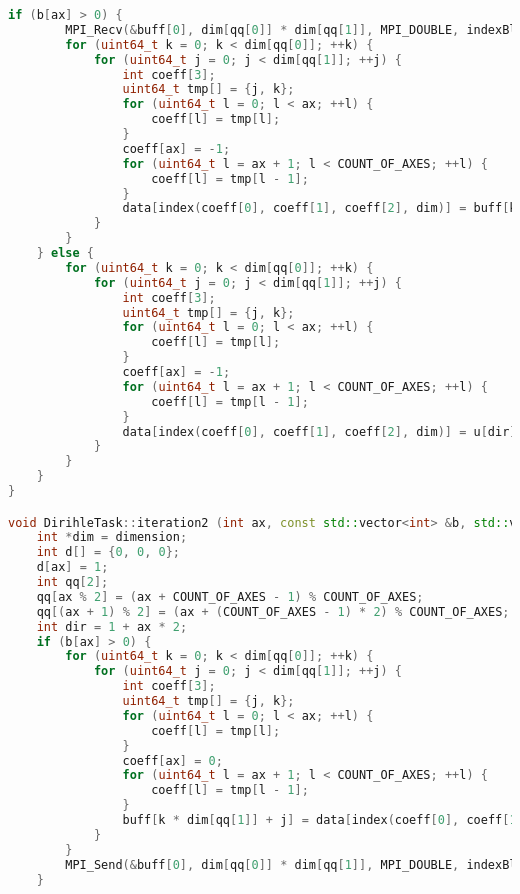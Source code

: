 \begin{lstlisting}[basicstyle=\normalfont, language=C++]
    if (b[ax] > 0) {
        MPI_Recv(&buff[0], dim[qq[0]] * dim[qq[1]], MPI_DOUBLE, indexBlock(b[X] - d[X], b[Y] - d[Y], b[Z] - d[Z], block), indexBlock(b[X] - d[X], b[Y] - d[Y], b[Z] - d[Z], block), MPI_COMM_WORLD, &status);
        for (uint64_t k = 0; k < dim[qq[0]]; ++k) {
            for (uint64_t j = 0; j < dim[qq[1]]; ++j) {
                int coeff[3];
                uint64_t tmp[] = {j, k};
                for (uint64_t l = 0; l < ax; ++l) {
                    coeff[l] = tmp[l];
                }
                coeff[ax] = -1;
                for (uint64_t l = ax + 1; l < COUNT_OF_AXES; ++l) {
                    coeff[l] = tmp[l - 1];
                }
                data[index(coeff[0], coeff[1], coeff[2], dim)] = buff[k * dim[qq[1]] + j];
            }
        }
    } else {
        for (uint64_t k = 0; k < dim[qq[0]]; ++k) {
            for (uint64_t j = 0; j < dim[qq[1]]; ++j) {
                int coeff[3];
                uint64_t tmp[] = {j, k};
                for (uint64_t l = 0; l < ax; ++l) {
                    coeff[l] = tmp[l];
                }
                coeff[ax] = -1;
                for (uint64_t l = ax + 1; l < COUNT_OF_AXES; ++l) {
                    coeff[l] = tmp[l - 1];
                }
                data[index(coeff[0], coeff[1], coeff[2], dim)] = u[dir];
            }
        }
    }
}

void DirihleTask::iteration2 (int ax, const std::vector<int> &b, std::vector<double> &buff, std::vector<double> &data) {
    int *dim = dimension;
    int d[] = {0, 0, 0};
    d[ax] = 1;
    int qq[2];
    qq[ax % 2] = (ax + COUNT_OF_AXES - 1) % COUNT_OF_AXES;
    qq[(ax + 1) % 2] = (ax + (COUNT_OF_AXES - 1) * 2) % COUNT_OF_AXES;
    int dir = 1 + ax * 2;
    if (b[ax] > 0) {
        for (uint64_t k = 0; k < dim[qq[0]]; ++k) {
            for (uint64_t j = 0; j < dim[qq[1]]; ++j) {
                int coeff[3];
                uint64_t tmp[] = {j, k};
                for (uint64_t l = 0; l < ax; ++l) {
                    coeff[l] = tmp[l];
                }
                coeff[ax] = 0;
                for (uint64_t l = ax + 1; l < COUNT_OF_AXES; ++l) {
                    coeff[l] = tmp[l - 1];
                }
                buff[k * dim[qq[1]] + j] = data[index(coeff[0], coeff[1], coeff[2], dim)];
            }
        }
        MPI_Send(&buff[0], dim[qq[0]] * dim[qq[1]], MPI_DOUBLE, indexBlock(b[X] - d[X], b[Y] - d[Y], b[Z] - d[Z], block), id, MPI_COMM_WORLD);
    }


\end{lstlisting}
